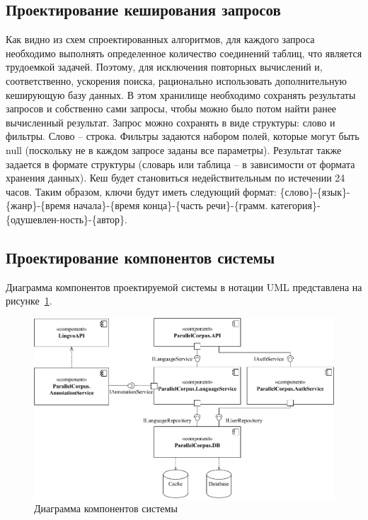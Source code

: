 
\subsection{Проектирование кеширования запросов}

Как видно из схем спроектированных алгоритмов, для каждого запроса необходимо выполнять определенное количество соединений таблиц, что является трудоемкой задачей. 
Поэтому, для исключения повторных вычислений и, соответственно, ускорения поиска, рационально использовать дополнительную кеширующую базу данных.
В этом хранилище необходимо сохранять результаты запросов и собственно сами запросы, чтобы можно было потом найти ранее вычисленный результат.
Запрос можно сохранять в виде структуры: слово и фильтры. 
Слово -- строка.
Фильтры задаются набором полей, которые могут быть null (поскольку не в каждом запросе заданы все параметры).
Результат также задается в формате структуры (словарь или таблица -- в зависимости от формата хранения данных).
Кеш будет становиться недействительным по истечении 24 часов.
Таким образом, ключи будут иметь следующий формат: \{слово\}-\{язык\}-\{жанр\}-\{время начала\}-\{время конца\}-\{часть речи\}-\{грамм. категория\}-\{одушевлен-ность\}-\{автор\}.

\subsection{Проектирование компонентов системы}

Диаграмма компонентов проектируемой системы в нотации UML представлена на рисунке~\ref{components}.

\begin{figure}[ht]
	\centering
	\includegraphics[scale=0.7]{img/components.pdf}
	\caption{Диаграмма компонентов системы}
	\label{components}
\end{figure}\pagebreak

